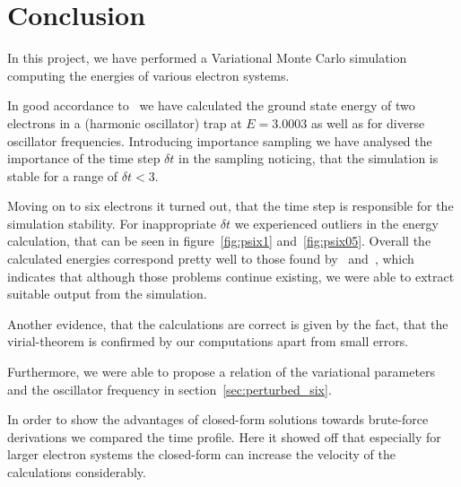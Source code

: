 \section{Conclusion}\label{sec:conclusion}
In this project, we have performed a Variational Monte Carlo simulation computing the energies of various electron systems.

In good accordance to~\cite{hogberget2013} we have calculated the ground state energy of two electrons in a (harmonic oscillator) trap at $E=3.0003$ as well as for diverse oscillator frequencies. Introducing importance sampling we have analysed the importance of the time step $\delta t$ in the sampling noticing, that the simulation is stable for a range of $\delta t < 3$. 

Moving on to six electrons it turned out, that the time step is responsible for the simulation stability. For inappropriate $\delta t$ we experienced outliers in the energy calculation, that can be seen in figure~\ref{fig:psix1} and~\ref{fig:psix05}. Overall the calculated energies correspond pretty well to those found by~\cite{hogberget2013} and~\cite{lohne2011}, which indicates that although those problems continue existing, we were able to extract suitable output from the simulation.

Another evidence, that the calculations are correct is given by the fact, that the virial-theorem is confirmed by our computations apart from small errors.

Furthermore, we were able to propose a relation of the variational parameters and the oscillator frequency in section~\ref{sec:perturbed_six}. 

In order to show the advantages of closed-form solutions towards brute-force derivations we compared the time profile. Here it showed off that especially for larger electron systems the closed-form can increase the velocity of the calculations considerably. 